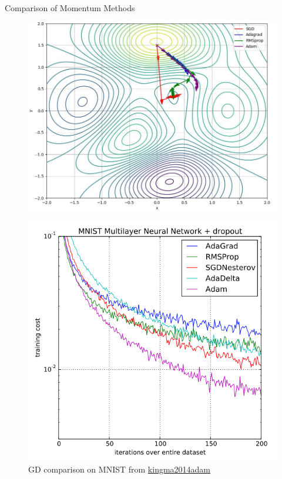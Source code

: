 \documentclass[serif, aspectratio=169]{beamer}
\begin{document}
\begin{frame}{Comparison of Momentum Methods}
    \begin{minipage}{0.5\textwidth}
        \centering
        \begin{center}
        \begin{figure}
        \centering
            \includegraphics[width=1\linewidth]{pic/all_moment.jpg}
        \end{figure}
        \end{center}
    \end{minipage}%
    \begin{minipage}{0.5\textwidth}
        \centering
        \begin{center}
        \begin{figure}
        \centering
            \includegraphics[width=0.8\linewidth]{pic/Adam_training_kingma2015.png}
            \caption{GD comparison on MNIST from \url{kingma2014adam}}
        \end{figure}
        \end{center}
    \end{minipage}
\end{frame}
%     
%     
\end{document}
